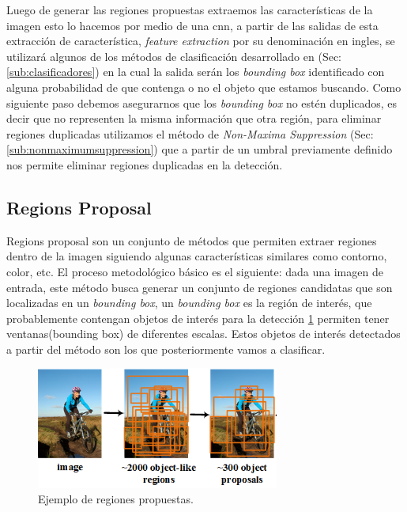 Luego de generar las regiones propuestas extraemos las características de la imagen esto lo hacemos por medio de una \ac{cnn}, a partir de las salidas de esta extracción de característica, \textit{feature extraction} por su denominación en ingles, se utilizará algunos de los métodos de clasificación desarrollado en (Sec:\ref{sub:clasificadores}) en la cual la salida serán los \textit{bounding box} identificado con alguna probabilidad de que contenga o no el objeto que estamos buscando. Como siguiente paso debemos  asegurarnos que los \textit{bounding box} no estén duplicados, es decir que no representen la misma información que otra región, para eliminar regiones duplicadas utilizamos el método de \textit{Non-Maxima Suppression} (Sec:\ref{sub:nonmaximumsuppression}) que a partir de un umbral previamente definido nos permite eliminar regiones duplicadas en la detección.



\subsection{Regions Proposal} \label{sub:regions-proposal}

Regions proposal son un conjunto de métodos que permiten extraer regiones dentro de la imagen siguiendo algunas características similares como contorno, color, etc. El proceso metodológico básico es el siguiente: dada una imagen de entrada, este método busca generar un conjunto de regiones candidatas que son localizadas en un \textit{bounding box}, un \textit{bounding box} es la región de interés, que probablemente contengan objetos de interés para la detección \ref{Fig: propsalregion} permiten tener ventanas(bounding box) de diferentes escalas. Estos objetos de interés detectados a partir del método son los que posteriormente vamos a clasificar.

\begin{figure}[H]
 \centering
  \includegraphics[height=4cm,keepaspectratio=true,clip=true]{imagenes/MarcoTeorico/regionProposal.png}
  \caption{Ejemplo de regiones propuestas.}%
	\label{Fig: propsalregion}
\end{figure}

